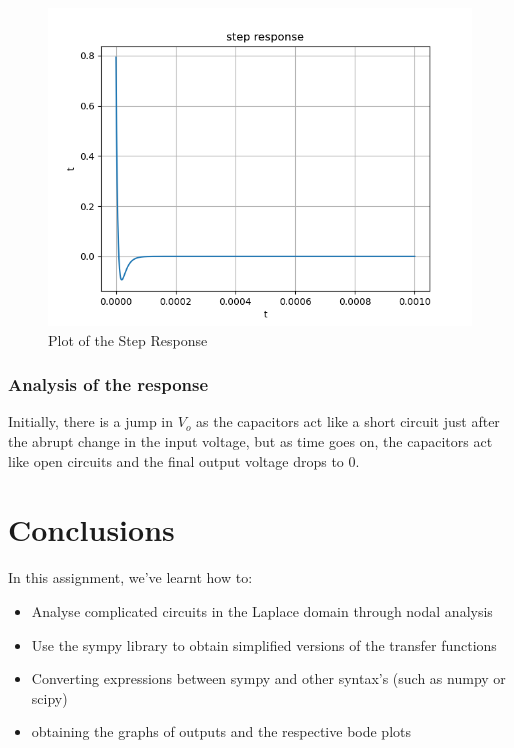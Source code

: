 \documentclass[11pt]{article}
\begin{document}
\begin{figure}[H]
    \centering
    \includegraphics[scale = 1]{Figure_11.png}
    \caption{Plot of the Step Response}
\end{figure}

\subsubsection{Analysis of the response}
Initially, there is a jump in $V_o$ as the capacitors act like a short circuit just after the abrupt change in the input voltage, but as time goes on, the capacitors act like open circuits and the final output voltage drops to 0. 

\section{Conclusions}
In this assignment, we've learnt how to:
\begin{itemize}
    \item Analyse complicated circuits in the Laplace domain through nodal analysis
    \item Use the sympy library to obtain simplified versions of the transfer functions
    \item Converting expressions between sympy and other syntax's (such as numpy or scipy)
    \item obtaining the graphs of outputs and the respective bode plots
\end{itemize}
\end{document}

